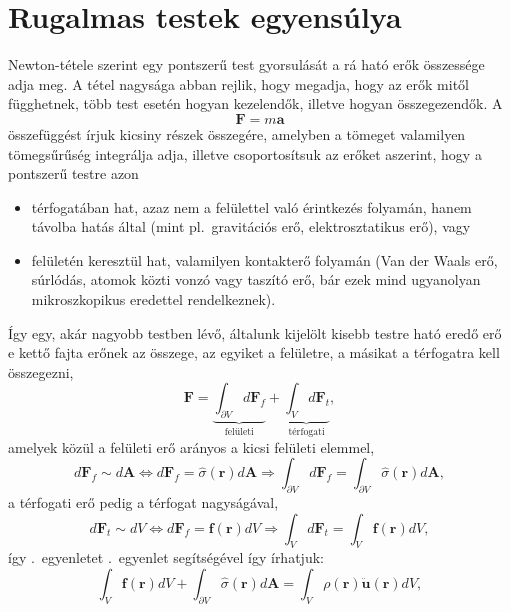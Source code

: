 \documentclass[12pt,a4paper]{scrartcl}
\let\mathbf\bm
\begin{document}
\section{Rugalmas testek egyensúlya}
Newton-tétele szerint egy pontszerű test gyorsulását a rá ható erők összessége adja meg. A tétel nagysága abban rejlik, hogy megadja, hogy az erők mitől függhetnek, több test esetén hogyan kezelendők, illetve hogyan összegezendők. A
\begin{equation} \label{eq:newton}
{\mathbf{F}} = m{\mathbf{a}}
\end{equation}
összefüggést írjuk kicsiny részek összegére, amelyben a tömeget valamilyen tömegsűrűség integrálja adja, illetve csoportosítsuk az erőket aszerint, hogy a pontszerű testre azon
\begin{itemize}
\item térfogatában hat, azaz nem a felülettel való érintkezés folyamán, hanem távolba hatás által (mint pl.\ gravitációs erő, elektrosztatikus erő), vagy
\item felületén keresztül hat, valamilyen kontakterő folyamán (Van der Waals erő, súrlódás, atomok közti vonzó vagy taszító erő, bár ezek mind ugyanolyan mikroszkopikus eredettel rendelkeznek).
\end{itemize}
Így egy, akár nagyobb testben lévő, általunk kijelölt kisebb testre ható eredő erő e kettő fajta erőnek az összege, az egyiket a felületre, a másikat a térfogatra kell összegezni,
\begin{equation} \label{eq:erok_csop}
{\mathbf{F}} = \underbrace {\int_{\partial V} {d{{\mathbf{F}}_f}} }_{{\text{felületi}}} + \underbrace {\int_V {d{{\mathbf{F}}_t}} }_{\text{térfogati}},
\end{equation}
amelyek közül a felületi erő arányos a kicsi felületi elemmel,
\[d{{\mathbf{F}}_f} \sim d{\mathbf{A}} \Leftrightarrow d{{\mathbf{F}}_f} = \hat \sigma \left( {\mathbf{r}} \right)d{\mathbf{A}} \Rightarrow \int_{\partial V} {d{{\mathbf{F}}_f}}  = \int_{\partial V} {\hat \sigma \left( {\mathbf{r}} \right)d{\mathbf{A}}},\]
a térfogati erő pedig a térfogat nagyságával,
\[d{{\mathbf{F}}_t} \sim dV \Leftrightarrow d{{\mathbf{F}}_f} = {\mathbf{f}}\left( {\mathbf{r}} \right)dV \Rightarrow \int_V {d{{\mathbf{F}}_t}}  = \int_V {{\mathbf{f}}\left( {\mathbf{r}} \right)dV},\]
így \az{\eqref{eq:newton}}.\ egyenletet \az{\eqref{eq:erok_csop}}.\ egyenlet segítségével így írhatjuk:
\[\int_V {{\mathbf{f}}\left( {\mathbf{r}} \right)dV}  + \int_{\partial V} {\hat \sigma \left( {\mathbf{r}} \right)d{\mathbf{A}}}  = \int_V {\rho \left( {\mathbf{r}} \right){\mathbf{\ddot u\left({\mathbf{r}}\right)}}dV} ,\]
\end{document}
